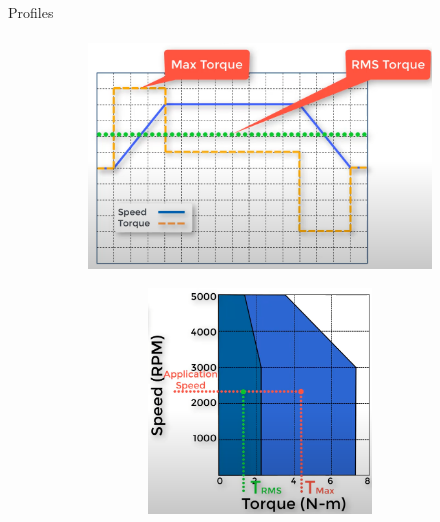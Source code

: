 \documentclass[aspectratio=169]{beamer}
\begin{document}
\begin{frame}[t]{Profiles}
\framesubtitle{}
    \begin{figure}[H]
        \begin{subfigure}{0.59\textwidth}
            \centering\includegraphics[height=6cm,width=1\textwidth,keepaspectratio]{motor_profile.png}
            \label{fig:motor_profile.png}
        \end{subfigure}
        \begin{subfigure}{0.39\textwidth}
            \centering\includegraphics[height=6cm,width=1\textwidth,keepaspectratio]{vel_profile.png}
            \label{fig:vel_profile.png}
        \end{subfigure}
    \end{figure}
\end{frame}
\end{document}
